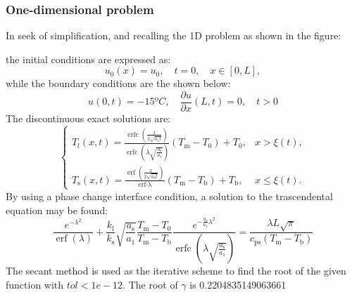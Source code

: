 \subsubsection*{One-dimensional problem}
In seek of simplification, and recalling the 1D problem as shown in the figure:

the initial conditions are expressed as:
\begin{equation}
	u_{0}(x)=u_{0}, \quad t=0, \quad x \in[0, L],
	\label{3.38}
\end{equation}
while the boundary conditions are the shown below:
\begin{equation}
u(0, t)=-15ºC, \quad \frac{\partial u}{\partial x}(L, t)=0, \quad t>0
\label{3.39}
\end{equation}
The discontinuous exact solutions are:
\begin{equation}
	\begin{cases}T_{l}(x, t)=\frac{\operatorname{erfc}\left(\frac{x}{2 \sqrt{a_{1} t}}\right)}{\operatorname{erfc}\left(\lambda \sqrt{\frac{a_{\mathrm{s}}}{a_{1}}}\right)}\left(T_{\mathrm{m}}-T_{0}\right)+T_{0}, & x>\xi(t), \\ 
	T_{\mathrm{s}}(x, t)=\frac{\operatorname{erf}\left(\frac{x}{2 \sqrt{a_{\mathrm{s}} t}}\right)}{\operatorname{erf \cdot\lambda }}\left(T_{\mathrm{m}}-T_{\mathrm{b}}\right)+T_{\mathrm{b}},& x \leq \xi(t)  .\end{cases}
	\label{3.40}
\end{equation}
By using a phase change interface condition, a solution to the trascendental equation may be found:
\begin{equation}
	\frac{e^{-\lambda^{2}}}{\operatorname{erf}(\lambda)}+\frac{k_{\mathrm{l}}}{k_{\mathrm{s}}} \sqrt{\frac{a_{\mathrm{s}}}{a_{1}}} \frac{T_{\mathrm{m}}-T_{0}}{T_{\mathrm{m}}-T_{\mathrm{b}}} \frac{e^{-\frac{a_{\mathrm{s}}}{a_{1}} \lambda^{2}}}{\operatorname{erfc}\left(\lambda \sqrt{\frac{a_{\mathrm{s}}}{a_{1}}}\right)}=\frac{\lambda L \sqrt{\pi}}{c_{\mathrm{ps}}\left(T_{\mathrm{m}}-T_{\mathrm{b}}\right)}
	\label{3.41}
\end{equation}
The secant method is used as the iterative scheme to find the root of the given function with $tol<1e-12$. The root of $\gamma$ is 0.2204835149063661


